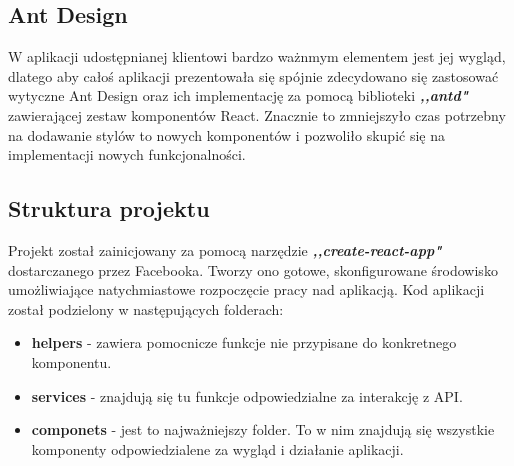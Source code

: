 \documentclass[declaration,shortabstract]{iithesis}
\begin{document}
\subsection{Ant Design}
W aplikacji udostępnianej klientowi bardzo ważnmym elementem jest jej wygląd, dlatego aby całoś aplikacji prezentowała się spójnie zdecydowano się zastosować wytyczne Ant Design oraz ich implementację za pomocą biblioteki \textbf{\textit{,,antd"}} zawierającej zestaw komponentów React. Znacznie to zmniejszyło czas potrzebny na dodawanie stylów to nowych komponentów i pozwoliło skupić się na implementacji nowych funkcjonalności. 

\subsection{Struktura projektu}
Projekt został zainicjowany za pomocą narzędzie \textbf{\textit{,,create-react-app"}} dostarczanego przez Facebooka. Tworzy ono gotowe, skonfigurowane środowisko umożliwiające natychmiastowe rozpoczęcie pracy nad aplikacją. Kod aplikacji został podzielony w następujących folderach: 
\begin{itemize}
    \item \textbf{\textunderscore helpers} - zawiera pomocnicze funkcje nie przypisane do konkretnego komponentu.
    \item \textbf{\textunderscore services} - znajdują się tu funkcje odpowiedzialne za interakcję z API.
    \item \textbf{componets} - jest to najważniejszy folder. To w nim znajdują się wszystkie komponenty odpowiedzialene za wygląd i działanie aplikacji.
\end{itemize}
\end{document}
